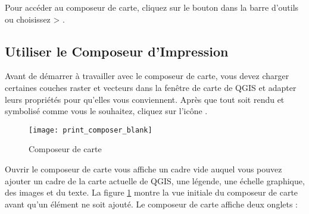 Pour accéder au composeur de carte, cliquez sur le bouton
 dans la barre d'outils ou choisissez
 > .

\subsection{Utiliser le Composeur d'Impression}\label{label_useprintcomposer} 


Avant de démarrer à travailler avec le composeur de carte, vous devez charger
certaines couches raster et vecteurs dans la fenêtre de carte de QGIS et 
adapter leurs propriétés pour qu'elles vous conviennent. Après que tout soit
rendu et symbolisé comme vous le souhaitez, cliquez sur l'icône 
.

\begin{figure}[ht]
   \begin{center}
    \caption{Composeur de carte\nixcaption}
\label{fig:print_composer_blank}\smallskip
   \texttt{[image: print\_composer\_blank]}
\end{center}
\end{figure}

Ouvrir le composeur de carte vous affiche un cadre vide auquel vous pouvez
ajouter un cadre de la carte actuelle de QGIS, une légende, une échelle
graphique, des images et du texte. La figure \ref{fig:print_composer_blank}
montre la vue initiale du composeur de carte avant qu'un élément ne soit
ajouté. Le composeur de carte affiche deux onglets :

